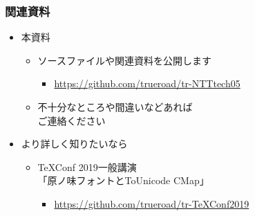 \begin{frame}\frametitle{関連資料}
  \begin{itemize}
  \item 本資料
    \begin{itemize}
    \item ソースファイルや関連資料を公開します
      \begin{itemize}
      \item {\tiny \url{https://github.com/trueroad/tr-NTTtech05}}
      \end{itemize}
    \item 不十分なところや間違いなどあれば \\ ご連絡ください
    \end{itemize}
  \item より詳しく知りたいなら
    \begin{itemize}
    \item TeXConf 2019一般講演 \\
      「原ノ味フォントとToUnicode CMap」 \\
      \begin{itemize}
      \item {\tiny \url{https://github.com/trueroad/tr-TeXConf2019}}
      \end{itemize}
    \end{itemize}
  \end{itemize}
\end{frame}


